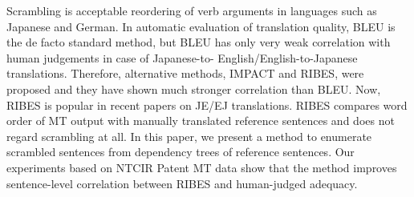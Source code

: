 Scrambling is acceptable reordering of verb arguments in languages such as Japanese and German. In automatic evaluation of translation quality, BLEU is the de facto standard method, but BLEU has only very weak correlation with human judgements in case of Japanese-to- English/English-to-Japanese translations. Therefore, alternative methods, IMPACT and RIBES, were proposed and they have shown much stronger correlation than BLEU. Now, RIBES is popular in recent papers on JE/EJ translations. RIBES compares word order of MT output with manually translated reference sentences and does not regard scrambling at all. In this paper, we present a method to enumerate scrambled sentences from dependency trees of reference sentences. Our experiments based on NTCIR Patent MT data show that the method improves sentence-level correlation between RIBES and human-judged adequacy.
